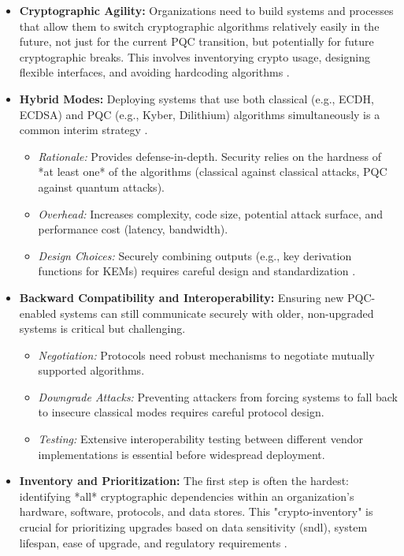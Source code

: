 \begin{itemize}
    \item \textbf{Cryptographic Agility:} Organizations need to build systems and processes that allow them to switch cryptographic algorithms relatively easily in the future, not just for the current PQC transition, but potentially for future cryptographic breaks. This involves inventorying crypto usage, designing flexible interfaces, and avoiding hardcoding algorithms \parencite{cryptographic-agility}.
    \item \textbf{Hybrid Modes:} Deploying systems that use both classical (e.g., ECDH, ECDSA) and PQC (e.g., Kyber, Dilithium) algorithms simultaneously is a common interim strategy \parencite{hybrid_crypto_2024}.
        \begin{itemize}
            \item \textit{Rationale:} Provides defense-in-depth. Security relies on the hardness of *at least one* of the algorithms (classical against classical attacks, PQC against quantum attacks).
            \item \textit{Overhead:} Increases complexity, code size, potential attack surface, and performance cost (latency, bandwidth).
            \item \textit{Design Choices:} Securely combining outputs (e.g., key derivation functions for KEMs) requires careful design and standardization \parencite{hybrid_protocols_2024}.
        \end{itemize}
    \item \textbf{Backward Compatibility and Interoperability:} Ensuring new PQC-enabled systems can still communicate securely with older, non-upgraded systems is critical but challenging.
        \begin{itemize}
            \item \textit{Negotiation:} Protocols need robust mechanisms to negotiate mutually supported algorithms.
            \item \textit{Downgrade Attacks:} Preventing attackers from forcing systems to fall back to insecure classical modes requires careful protocol design.
            \item \textit{Testing:} Extensive interoperability testing between different vendor implementations is essential before widespread deployment.
        \end{itemize}
    \item \textbf{Inventory and Prioritization:} The first step is often the hardest: identifying *all* cryptographic dependencies within an organization's hardware, software, protocols, and data stores. This "crypto-inventory" is crucial for prioritizing upgrades based on data sensitivity (\gls{sndl}), system lifespan, ease of upgrade, and regulatory requirements \parencite{migration_risk_2024, quantum_mitigation_framework_2024}.
\end{itemize}

